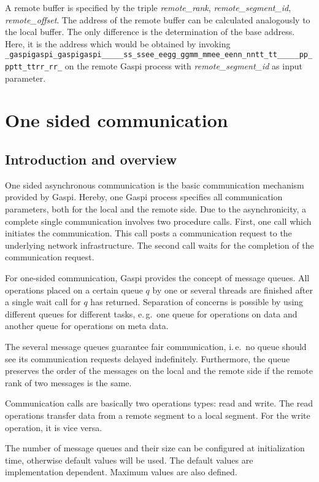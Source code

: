 \documentclass{article}
\makeatletter
\newlength{\st}\setlength{\st}{0pt}
\newcommand{\zerowsep}{\hskip 0pt plus 0.1pt minus 0.1pt}
\newcommand{\ZSEP}[1]{\ifx#1\@@@EOZ@@@\let\next\relax\else\ifx#1\_#1\zerowsep\else#1\fi\let\next\ZSEP\fi\next}
\newcommand{\zsep}[1]{\ZSEP{}#1\@@@EOZ@@@}
\newcommand{\gaspiprefix}{gaspi}
\newcommand{\GASPI}{{\sc Gaspi}}
\newcommand{\function}[1]{{\tt #1}}
\newcommand{\parameter}[1]{{\it #1}}
\newcommand{\gaspifunction}[1]{\function{\protect\zsep{\gaspiprefix\_#1}}}
\makeatother
\begin{document}
A remote buffer is specified by the triple \parameter{remote\_rank}, \parameter{remote\_segment\_id},
\parameter{remote\_offset}.
The address of the remote  buffer can be calculated analogously to the local buffer. The only
difference is the determination of the base address. Here, it is the address
which would be obtained by invoking \gaspifunction{segment\_ptr}
on the remote \GASPI{} process with \parameter{remote\_segment\_id} as input parameter.

\section{One sided communication}

\subsection{Introduction and overview}

One sided asynchronous communication is the basic communication
mechanism provided by \GASPI{}. Hereby, one \GASPI{} process specifies
all communication parameters, both for the local and the remote
side. Due to the asynchronicity, a complete single communication
involves two procedure calls. First, one call which initiates the
communication.  This call posts a communication request to the
underlying network infrastructure.  The second call waits for the
completion of the communication request.

For one-sided communication, \GASPI{} provides the concept of message
queues.  All operations placed on a certain queue $q$ by one or
several threads are finished after a single wait call for $q$ has
returned. Separation of concerns is possible by using different queues
for different tasks, e.\,g.\ one queue for operations on data and
another queue for operations on meta data.

The several message queues guarantee fair communication, i.\,e.\ no queue
should see its communication requests delayed indefinitely. Furthermore,
the queue preserves the order of the messages on the local and the
remote side if the remote rank of two messages is the same.

Communication calls are basically two operations types: read and write.
The read operations transfer data from a remote segment
to a local segment.
For the write operation, it is vice versa.

The number of message queues and their size can be configured at initialization
time, otherwise default values will be used. The default values are implementation
dependent. Maximum values are also defined.
\end{document}
